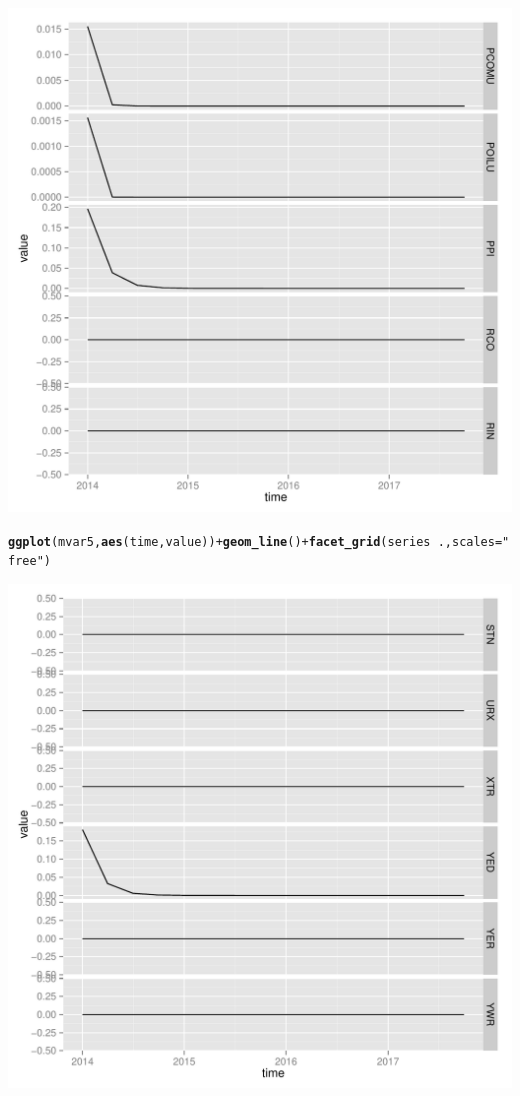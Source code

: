 \documentclass[11pt,oneside, a4paper]{amsart}\usepackage[]{graphicx}\usepackage[]{color}
\makeatletter
\def\maxwidth{ %
  \ifdim\Gin@nat@width>\linewidth
    \linewidth
  \else
    \Gin@nat@width
  \fi
}
\newcommand{\hlstr}[1]{\textcolor[rgb]{0.192,0.494,0.8}{#1}}%
\newcommand{\hlopt}[1]{\textcolor[rgb]{0,0,0}{#1}}%
\newcommand{\hlstd}[1]{\textcolor[rgb]{0.345,0.345,0.345}{#1}}%
\newcommand{\hlkwc}[1]{\textcolor[rgb]{0.333,0.667,0.333}{#1}}%
\newcommand{\hlkwd}[1]{\textcolor[rgb]{0.737,0.353,0.396}{\textbf{#1}}}%
\newenvironment{kframe}{%
 \def\at@end@of@kframe{}%
 \ifinner\ifhmode%
  \def\at@end@of@kframe{\end{minipage}}%
  \begin{minipage}{\columnwidth}%
 \fi\fi%
 \def\FrameCommand##1{\hskip\@totalleftmargin \hskip-\fboxsep
 \colorbox{shadecolor}{##1}\hskip-\fboxsep
     \hskip-\linewidth \hskip-\@totalleftmargin \hskip\columnwidth}%
 \MakeFramed {\advance\hsize-\width
   \@totalleftmargin\z@ \linewidth\hsize
   \@setminipage}}%
 {\par\unskip\endMakeFramed%
 \at@end@of@kframe}
\newenvironment{knitrout}{}{} %
\makeatother
\begin{document}
\begin{knitrout}
\includegraphics[width=\maxwidth]{figure/unnamed-chunk-2-4} 
\begin{kframe}\begin{alltt}
\hlkwd{ggplot}\hlstd{(mvar5,} \hlkwd{aes}\hlstd{(time,value))} \hlopt{+} \hlkwd{geom_line}\hlstd{()} \hlopt{+} \hlkwd{facet_grid}\hlstd{(series} \hlopt{~} \hlstd{. ,}\hlkwc{scales}\hlstd{=}\hlstr{"free"}\hlstd{)}
\end{alltt}
\end{kframe}
\includegraphics[width=\maxwidth]{figure/unnamed-chunk-2-5} 

\end{knitrout}
\end{document}

